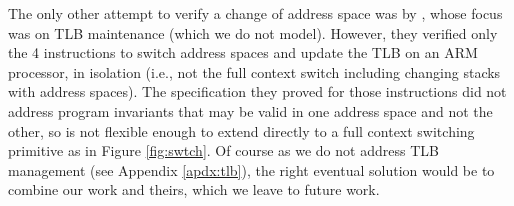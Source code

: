 
The only other attempt to verify a change of address space was by \citet{syeda2018program,syeda2020formal}, whose focus was on TLB maintenance (which we
do not model). However, they verified only the 4 instructions to switch address spaces and update the TLB on an ARM processor, in isolation
(i.e., not the full context switch including changing stacks with address spaces).
The specification they proved for those instructions did not address program invariants that may be valid in one address space and not the other,
so is not flexible enough to extend directly to a full context switching primitive as in Figure \ref{fig:swtch}.
Of course as we do not address TLB management (see Appendix \ref{apdx:tlb}), the right eventual solution would be to combine our work
and theirs, which we leave to future work.

